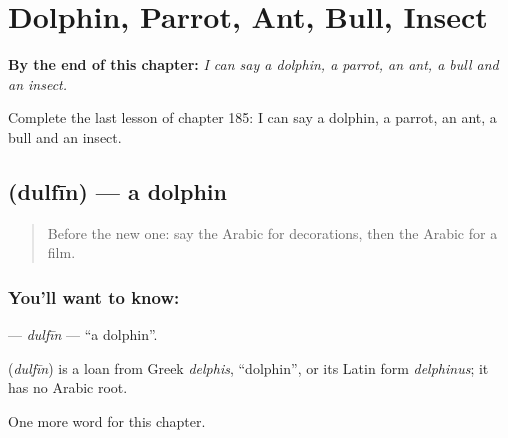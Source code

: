 
\chapter{Dolphin, Parrot, Ant, Bull, Insect}
\label{ch:ar-dolphin-parrot-ant-bull-insect}

\begin{chapteropening}
\textbf{By the end of this chapter:} \emph{I can say a dolphin, a parrot, an ant, a bull and an insect.}

Complete the last lesson of chapter 185: I can say a dolphin, a parrot, an ant, a bull and an insect.
\end{chapteropening}

\section[\texorpdfstring{\ar{دلفين} (dulfīn)}{دلفين (dulfīn)}]{ (dulfīn) — a dolphin}

\label{lesson:AR-C185-dulfin}



\begin{quote}
Before the new one: say the Arabic for decorations, then the Arabic for a film.
\end{quote}

\subsection*{You'll want to know: }
\textbf{} — \emph{dulfīn} — \textquotedblleft{}a dolphin\textquotedblright{}.

\begin{cousinweb}
\textbf{} (\emph{dulfīn}) is a loan from Greek \emph{delphis}, \textquotedblleft{}dolphin\textquotedblright{}, or its Latin form \emph{delphinus}; it has no Arabic root.
\end{cousinweb}

\begin{grammarlens}[title={What you've built}]
One more word for this chapter.
\end{grammarlens}

